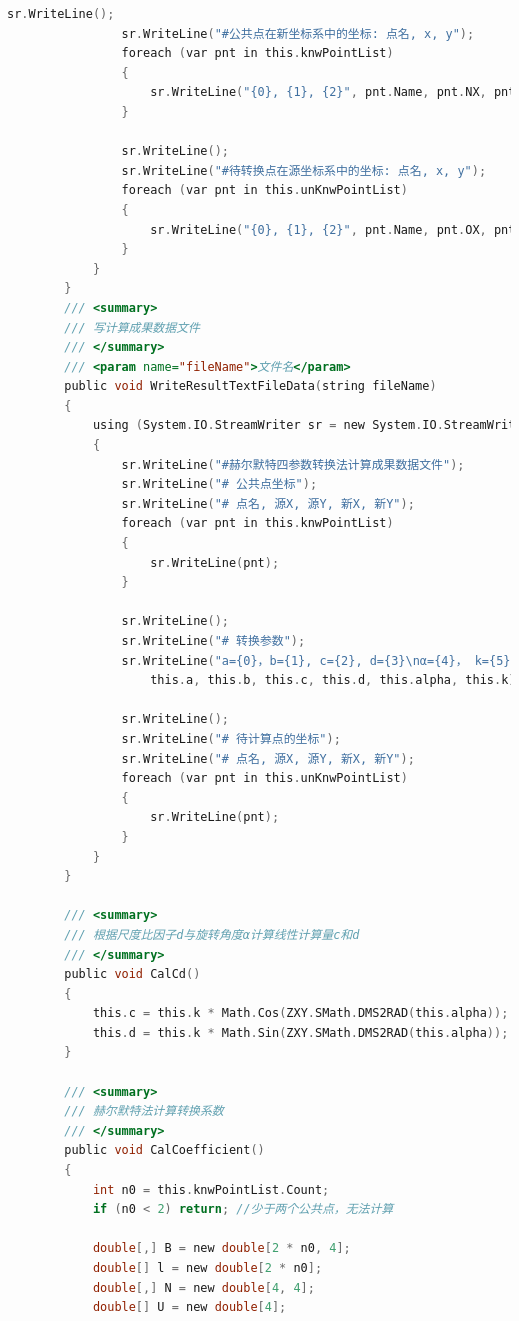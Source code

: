 \begin{lstlisting}[language=C]
                sr.WriteLine();
                sr.WriteLine("#公共点在新坐标系中的坐标: 点名, x, y");
                foreach (var pnt in this.knwPointList)
                {
                    sr.WriteLine("{0}, {1}, {2}", pnt.Name, pnt.NX, pnt.NY);
                }

                sr.WriteLine();
                sr.WriteLine("#待转换点在源坐标系中的坐标: 点名, x, y");
                foreach (var pnt in this.unKnwPointList)
                {
                    sr.WriteLine("{0}, {1}, {2}", pnt.Name, pnt.OX, pnt.OY);
                }
            }
        }
        /// <summary>
        /// 写计算成果数据文件
        /// </summary>
        /// <param name="fileName">文件名</param>
        public void WriteResultTextFileData(string fileName)
        {
            using (System.IO.StreamWriter sr = new System.IO.StreamWriter(fileName))
            {
                sr.WriteLine("#赫尔默特四参数转换法计算成果数据文件");
                sr.WriteLine("# 公共点坐标");
                sr.WriteLine("# 点名, 源X, 源Y, 新X, 新Y");
                foreach (var pnt in this.knwPointList)
                {
                    sr.WriteLine(pnt);
                }

                sr.WriteLine();
                sr.WriteLine("# 转换参数");
                sr.WriteLine("a={0}，b={1}, c={2}, d={3}\nα={4}， k={5}", 
                    this.a, this.b, this.c, this.d, this.alpha, this.k);

                sr.WriteLine();
                sr.WriteLine("# 待计算点的坐标");
                sr.WriteLine("# 点名, 源X, 源Y, 新X, 新Y");
                foreach (var pnt in this.unKnwPointList)
                {
                    sr.WriteLine(pnt);
                }
            }
        }

        /// <summary>
        /// 根据尺度比因子d与旋转角度α计算线性计算量c和d
        /// </summary>
        public void CalCd()
        {
            this.c = this.k * Math.Cos(ZXY.SMath.DMS2RAD(this.alpha));
            this.d = this.k * Math.Sin(ZXY.SMath.DMS2RAD(this.alpha));
        }

        /// <summary>
        /// 赫尔默特法计算转换系数
        /// </summary>
        public void CalCoefficient()
        {
            int n0 = this.knwPointList.Count;
            if (n0 < 2) return; //少于两个公共点，无法计算

            double[,] B = new double[2 * n0, 4];
            double[] l = new double[2 * n0];
            double[,] N = new double[4, 4];
            double[] U = new double[4];


\end{lstlisting}
